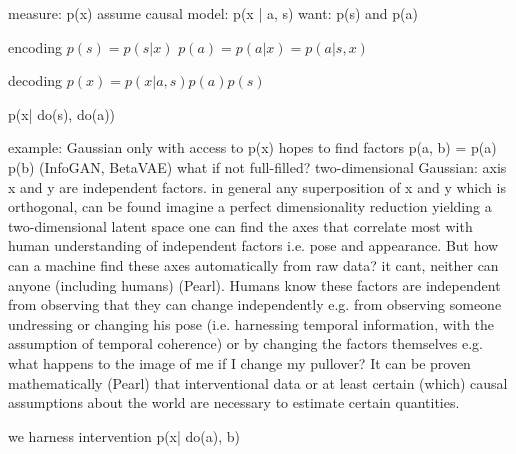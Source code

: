 	measure: p(x)
	assume causal model: p(x | a, s)
	want: p(s) and p(a)

	encoding
	$p(s) = p(s | x )$
	$p(a) = p(a | x) = p(a | s, x)$

	decoding
	$p(x) = p(x | a, s) p(a) p(s)$

	p(x| do(s), do(a))

	example: Gaussian
	only with access to p(x)
	hopes to find factors p(a, b) = p(a) p(b) (InfoGAN, BetaVAE)
	what if not full-filled?
	two-dimensional Gaussian: axis x and y are independent factors.
	in general any superposition of x and y which is orthogonal, can be found
	imagine a perfect dimensionality reduction yielding a  two-dimensional latent space one can find the axes that correlate most with human understanding of independent factors i.e. pose and appearance.
	But how can a machine find these axes automatically from raw data? it cant, neither can anyone (including humans) (Pearl). Humans know these factors are independent from observing that they can change independently e.g. from observing someone undressing or changing his pose (i.e. harnessing temporal information, with the assumption of temporal coherence) or by changing the factors themselves e.g. what happens to the image of me if I change my pullover?
	It can be proven mathematically (Pearl) that interventional data or at least certain (which) causal assumptions about the world are necessary to estimate certain quantities.



	we harness intervention
	p(x| do(a), b)
